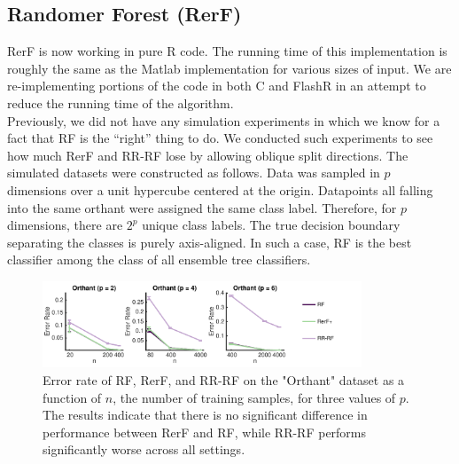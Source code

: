 \documentclass[simplex.tex]{subfiles}
\begin{document}
\subsection[Randomer Forest]{Randomer Forest (RerF)}

RerF is now working in pure R code.  The running time of this
implementation is roughly the same as the Matlab implementation for
various sizes of input.  We are re-implementing portions of the code in
both C and FlashR in an attempt to reduce the running time of the
algorithm. \\


Previously, we did not have any simulation experiments in which we know
for a fact that RF is the ``right'' thing to do. We conducted such
experiments to see how much RerF and RR-RF lose by allowing oblique
split directions. The simulated datasets were constructed as follows.
Data was sampled in $p$ dimensions over a unit hypercube centered at the
origin. Datapoints all falling into the same orthant were assigned the
same class label. Therefore, for $p$ dimensions, there are $2^p$ unique
class labels. The true decision boundary separating the classes is
purely axis-aligned. In such a case, RF is the best classifier among the
class of all ensemble tree classifiers.

\begin{figure}[!h]
\begin{cframed}
\centering
\includegraphics[width=0.85\textwidth]{../../figs/RerF.pdf}
\caption{Error rate of RF, RerF, and RR-RF on the "Orthant" dataset as a
  function of $n$, the number of training samples, for three values of
  $p$. The results indicate that there is no significant difference in
  performance between RerF and RF, while RR-RF performs significantly
  worse across all settings.}
\label{fig:name}
\end{cframed}
\end{figure}


\clearpage
\end{document}
